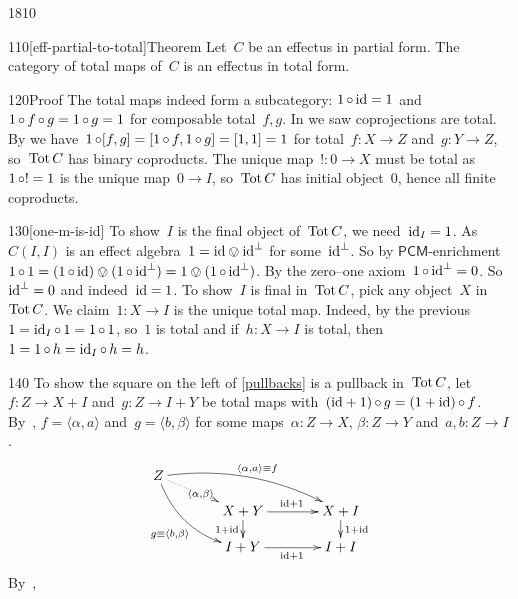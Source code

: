 \begin{parsec}{1810}
\begin{point}{110}[eff-partial-to-total]{Theorem}%
Let~$C$ be an effectus in partial form.
The category of total maps of~$C$ is an effectus in total form.
    \cite[thm.~4.10]{kentapartial}
\begin{point}{120}{Proof}%
The total maps indeed form a subcategory: $1 \mathop{\circ} \mathrm{id} = 1$
    and $1 \mathop{\circ} f \mathop{\circ} g = 1 \mathop{\circ} g = 1$ for composable total~$f,g$.
In  we saw coprojections are total.
By 
    we have~$1 \mathop{\circ} [f,g] = [1 \mathop{\circ} f, 1 \mathop{\circ} g] = [1,1] = 1$
    for total~$f\colon X \to Z$ and~$g\colon Y \to Z$,
    so~$\operatorname{Tot} C$ has binary coproducts.
The unique map~$!\colon 0 \to X$ must be total
    as~$1 \mathop{\circ} ! = 1$ is the unique map~$0 \to I$,
    so~$\operatorname{Tot} C$ has initial object~$0$, hence all finite coproducts.
\end{point}
\begin{point}{130}[one-m-is-id]%
To show~$I$ is the final object of~$\operatorname{Tot} C$,
    we need~$\mathrm{id}_I = 1$.
As~$C(I,I)$ is an effect algebra~$1 = \mathrm{id} \ovee \mathrm{id}^\perp$
    for some~$\mathrm{id}^\perp$.
    So by $\mathsf{PCM}$-enrichment~$1 \mathop{\circ} 1 = (1 \mathop{\circ} \mathrm{id}) \ovee (1 \mathop{\circ}\mathrm{id}^\perp) = 
1 \ovee (1 \mathop{\circ} \mathrm{id}^\perp)$.
By the zero--one axiom~$1 \mathop{\circ} \mathrm{id}^\perp = 0$.
So~$\mathrm{id}^\perp = 0$ and indeed~$\mathrm{id} = 1$.
To show~$I$ is final in~$\operatorname{Tot} C$, pick any object~$X$ in~$\operatorname{Tot} C$.
We claim~$1 \colon X \to I$ is the unique total map.
Indeed, by the previous $1 = \mathrm{id}_I \mathop{\circ} 1 = 1 \mathop{\circ} 1$, so~$1$ is total
and if~$h\colon X \to I$ is total, then~$1=1 \mathop{\circ} h = \mathrm{id}_I \mathop{\circ} h = h$.
\end{point}
\begin{point}{140}%
To show the square on the left of \eqref{pullbacks} is a pullback
    in~$\operatorname{Tot} C$,
let~$f\colon Z \to X+I$ 
and~$g\colon Z \to I+Y$ be total maps
    with~$(\mathrm{id}+1) \mathop{\circ} g = (1+\mathrm{id}) \mathop{\circ} f$.
By~, $f = \langle \alpha, a \rangle$
    and~$g = \langle b, \beta \rangle$
    for some maps~$\alpha\colon Z \to X$, $\beta\colon Z \to Y$
        and~$a,b\colon Z \to I$.
\begin{equation*}
\xymatrix@C+1pc@R-1pc{ 
Z \ar@/^1pc/[rrd]^{\langle\alpha,a \rangle \equiv f}
    \ar@/_1pc/[rdd]_{g \equiv \langle b, \beta\rangle}
    \ar@{.>}[rd]|{\langle \alpha, \beta\rangle}
    \\
    &  X+Y \ar[r]^{\id+1} \ar[d]_{1+\id} & X+I\ar[d]^{1+\id} \\
    &I+Y\ar[r]_{\id+1} & I+I
    }
\end{equation*}
By~,

\end{point}
\end{point}
\end{parsec}
